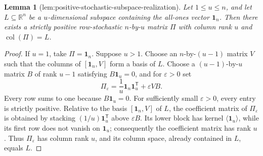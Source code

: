 \documentclass{article}
\newtheorem{lemma}{Lemma}
\begin{document}
\begin{lemma}[lem:positive-stochastic-subspace-realization]\label{lem:positive-stochastic-subspace-realization}
Let \(1\le u\le n\), and let \(L\subseteq\mathbb R^n\) be a \(u\)-dimensional subspace containing the all-ones vector \(\mathbf 1_n\). Then there exists a strictly positive row-stochastic \(n\)-by-\(u\) matrix \(\Pi\) with column rank \(u\) and \(\operatorname{col}(\Pi)=L\).
\end{lemma}
\begin{proof}
If \(u=1\), take \(\Pi=\mathbf1_n\). Suppose \(u>1\). Choose an \(n\)-by-\((u-1)\) matrix \(V\) such that the columns of \([\mathbf1_n,V]\) form a basis of \(L\). Choose a \((u-1)\)-by-\(u\) matrix \(B\) of rank \(u-1\) satisfying \(B\mathbf1_u=0\), and for \(\varepsilon>0\) set
\[
\Pi_\varepsilon=\frac1u\mathbf1_n\mathbf1_u^{\mathsf T}+\varepsilon VB.
\]
Every row sums to one because \(B\mathbf1_u=0\). For sufficiently small \(\varepsilon>0\), every entry is strictly positive. Relative to the basis \([\mathbf1_n,V]\) of \(L\), the coefficient matrix of \(\Pi_\varepsilon\) is obtained by stacking \((1/u)\mathbf1_u^{\mathsf T}\) above \(\varepsilon B\). Its lower block has kernel \(\langle\mathbf1_u\rangle\), while its first row does not vanish on \(\mathbf1_u\); consequently the coefficient matrix has rank \(u\). Thus \(\Pi_\varepsilon\) has column rank \(u\), and its column space, already contained in \(L\), equals \(L\).
\end{proof}
\end{document}

